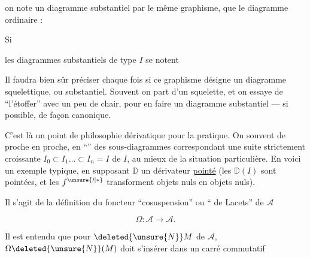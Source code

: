 on note un diagramme substantiel  par le même graphisme, que le  diagramme ordinaire :


Si


les diagrammes substantiels de type $I$ se notent


Il faudra bien sûr préciser chaque fois si ce graphisme désigne un diagramme squelettique, ou substantiel. Souvent on part d'un squelette, et on essaye de ``l'étoffer'' avec un peu de chair, pour en faire un diagramme substantiel --- si possible, de façon canonique.

C'est là un point de philosophie dérivatique  pour la pratique. On  souvent de proche en proche, en ``'' des sous-diagrammes correspondant  une suite strictement croissante $I_0\subset I_1\ldots\subset I_n=I$ de $I$, au mieux de la situation particulière.
En voici un exemple typique, en supposant $\mathbb D$ un dérivateur \uline{pointé} (les $\mathbb D(I)$ sont pointées, et les $f^{\unsure{\prime|*}}$ transforment objets nuls en objets nuls).

Il s'agit de la définition du foncteur  ``cosuspension'' ou `` de Lacets'' de $\mathcal A$

\[
\Omega:\mathcal A\longrightarrow\mathcal A.
\]

Il est entendu que pour $\deleted{\unsure{N}}M$ de $\mathcal A$, $\Omega\deleted{\unsure{N}}(M)$ doit s'insérer dans un carré commutatif

